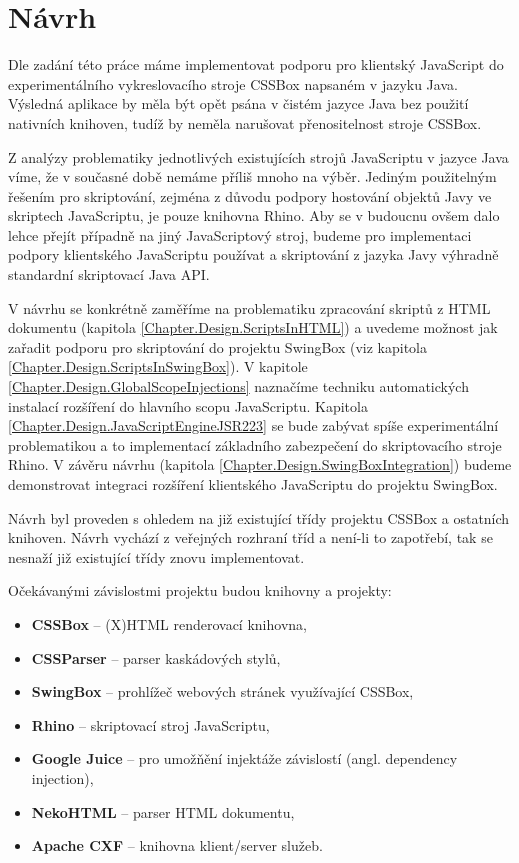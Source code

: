 \chapter{Návrh}
\label{Chapter.Design}

Dle zadání této práce máme implementovat podporu pro klientský JavaScript do experimentálního vykreslovacího stroje CSSBox napsaném v jazyku Java. Výsledná aplikace by měla být opět psána v čistém jazyce Java bez použití nativních knihoven, tudíž by neměla narušovat přenositelnost stroje CSSBox.

Z  analýzy problematiky jednotlivých existujících strojů JavaScriptu v jazyce Java víme, že v současné době nemáme příliš mnoho na výběr. Jediným použitelným řešením pro skriptování, zejména z důvodu podpory hostování objektů Javy ve skriptech JavaScriptu, je pouze knihovna Rhino. Aby se v budoucnu ovšem dalo lehce přejít případně na jiný JavaScriptový stroj, budeme pro implementaci podpory klientského JavaScriptu používat a skriptování z jazyka Javy výhradně standardní skriptovací Java API.

V návrhu se konkrétně zaměříme na problematiku zpracování skriptů z HTML dokumentu (kapitola \ref{Chapter.Design.ScriptsInHTML}) a uvedeme možnost jak zařadit podporu pro skriptování do projektu SwingBox (viz kapitola \ref{Chapter.Design.ScriptsInSwingBox}). V kapitole \ref{Chapter.Design.GlobalScopeInjections} naznačíme techniku automatických instalací rozšíření do hlavního scopu JavaScriptu. Kapitola \ref{Chapter.Design.JavaScriptEngineJSR223} se bude zabývat spíše experimentální problematikou a to implementací základního zabezpečení do skriptovacího stroje Rhino. V závěru návrhu (kapitola \ref{Chapter.Design.SwingBoxIntegration}) budeme demonstrovat integraci rozšíření klientského JavaScriptu do projektu SwingBox.

Návrh byl proveden s ohledem na již existující třídy projektu CSSBox a ostatních knihoven. Návrh vychází z veřejných rozhraní tříd a není-li to zapotřebí, tak se nesnaží již existující třídy znovu implementovat. 

\bigskip \noindent Očekávanými závislostmi projektu budou knihovny a projekty:

\begin{itemize}
  \item \textbf{CSSBox} \cite{Bibliography.CSSBox} -- (X)HTML renderovací knihovna,
  \item \textbf{CSSParser} \cite{Bibliography.jStyleParser} -- parser kaskádových stylů,
  \item \textbf{SwingBox} \cite{Bibliography.SwingBox} -- prohlížeč webových stránek využívající CSSBox,
  \item \textbf{Rhino} \cite{Bibliography.Rhino.Docs} -- skriptovací stroj JavaScriptu,
  \item \textbf{Google Juice} \cite{Bibliography.Google.Juice} -- pro umožňění injektáže závislostí (angl. dependency injection),  
  \item \textbf{NekoHTML} \cite{Bibliography.NekoHTML} -- parser HTML dokumentu,
  \item \textbf{Apache CXF} \cite{Bibliography.Apache.CXF} -- knihovna klient/server služeb.
\end{itemize}

